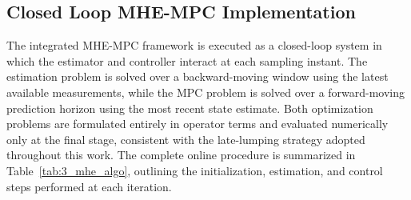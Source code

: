 \subsection{Closed Loop MHE-MPC Implementation} \label{sec:3_mhe_mpc}

The integrated MHE-MPC framework is executed as a closed-loop system in which the estimator and controller interact at each sampling instant. The estimation problem is solved over a backward-moving window using the latest available measurements, while the MPC problem is solved over a forward-moving prediction horizon using the most recent state estimate. Both optimization problems are formulated entirely in operator terms and evaluated numerically only at the final stage, consistent with the late-lumping strategy adopted throughout this work. The complete online procedure is summarized in Table~\ref{tab:3_mhe_algo}, outlining the initialization, estimation, and control steps performed at each iteration.

